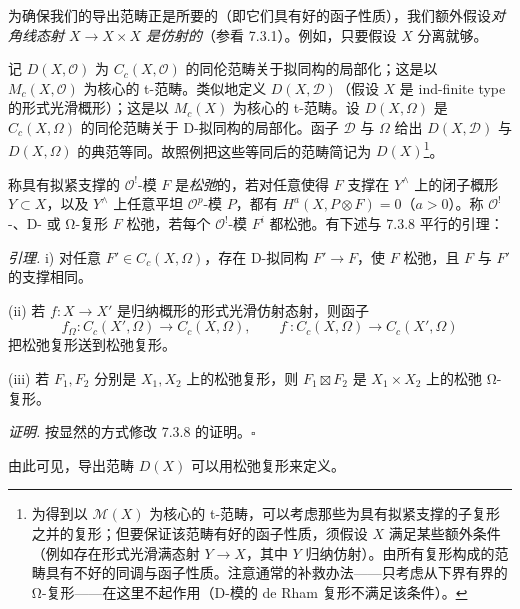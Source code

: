 
为确保我们的导出范畴正是所要的（即它们具有好的函子性质），我们额外假设\emph{对角线态射 $X\to X\times X$ 是仿射的}（参看 7.3.1）。例如，只要假设 $X$ 分离就够。

记 $D(X,\mathcal{O})$ 为 $C_c(X,\mathcal{O})$ 的同伦范畴关于拟同构的局部化；这是以 $M_c(X,\mathcal{O})$ 为核心的 t-范畴。类似地定义 $D(X,\mathcal{D})$（假设 $X$ 是 ind-finite type 的形式光滑概形）；这是以 $M_c(X)$ 为核心的 t-范畴。设 $D(X,\Omega)$ 是 $C_c(X,\Omega)$ 的同伦范畴关于 D-拟同构的局部化。函子 $\mathcal{D}$ 与 $\Omega$ 给出 $D(X,\mathcal{D})$ 与 $D(X,\Omega)$ 的典范等同。故照例把这些等同后的范畴简记为 $D(X)$\footnote{为得到以 $\mathcal{M}(X)$ 为核心的 t-范畴，可以考虑那些为具有拟紧支撑的子复形之并的复形；但要保证该范畴有好的函子性质，须假设 $X$ 满足某些额外条件（例如存在形式光滑满态射 $Y\to X$，其中 $Y$ 归纳仿射）。由所有复形构成的范畴具有不好的同调与函子性质。注意通常的补救办法——只考虑从下界有界的 Ω-复形——在这里不起作用（D-模的 de Rham 复形不满足该条件）。}。

称具有拟紧支撑的 $\mathcal{O}^!$-模 $F$ 是\emph{松弛}的，若对任意使得 $F$ 支撑在 $Y^\wedge$ 上的闭子概形 $Y\subset X$，以及 $Y^\wedge$ 上任意平坦 $\mathcal{O}^p$-模 $P$，都有 $H^a(X,P\otimes F)=0$（$a>0$）。称 $\mathcal{O}^!$-、D- 或 Ω-复形 $F$ 松弛，若每个 $\mathcal{O}^!$-模 $F^i$ 都松弛。有下述与 7.3.8 平行的引理：

 \emph{引理.} i) 对任意 $F'\in C_c(X,\Omega)$，存在 D-拟同构 $F'\to F$，使 $F$ 松弛，且 $F$ 与 $F'$ 的支撑相同。

(ii) 若 $f:X\to X'$ 是归纳概形的形式光滑仿射态射，则函子
\[
f^\cdot_\Omega:C_c(X',\Omega)\to C_c(X,\Omega),\qquad f^\cdot:C_c(X,\Omega)\to C_c(X',\Omega)
\]
把松弛复形送到松弛复形。



(iii) 若 $F_1,F_2$ 分别是 $X_1,X_2$ 上的松弛复形，则 $F_1\boxtimes F_2$ 是 $X_1\times X_2$ 上的松弛 Ω-复形。

\emph{证明.} 按显然的方式修改 7.3.8 的证明。\hfill$\square$

由此可见，导出范畴 $D(X)$ 可以用松弛复形来定义。

